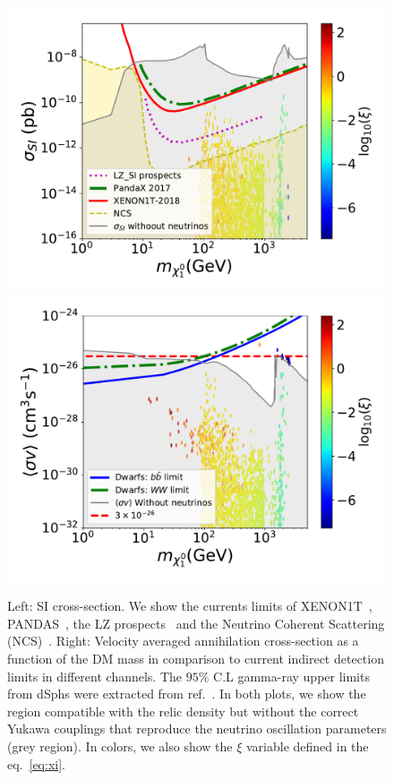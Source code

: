 \documentclass[12pt,letterpaper]{article}
\begin{document}
\begin{figure}
\begin{center}
\includegraphics[scale=0.43]{sigmaSI_with_neutrino_physics}
\includegraphics[scale=0.43]{sigmav_with_neutrino_physics}
\caption{Left: SI cross-section. We show the currents limits of XENON1T~\cite{Aprile:2018dbl}, PANDAS~\cite{Cui:2017nnn}, the LZ prospects~\cite{Mount:2017qzi} and the Neutrino Coherent Scattering (NCS)~\cite{Cushman:2013zza, Billard:2013qya}. 
Right:  Velocity averaged annihilation cross-section as a function of the DM
mass in comparison to current indirect detection limits in different channels. The $95\%$ C.L gamma-ray upper limits from dSphs were extracted from ref.~\cite{Ackermann:2015zua}.
In both plots, we show the region compatible with the relic density but without the correct Yukawa couplings that reproduce the neutrino oscillation parameters (grey region). In colors, we also show the $\xi$ variable defined in the eq.~\ref{eq:xi}.
}
\label{fig:SI-and-sv-with-neutrinos-scan}
\end{center}
\end{figure}
\end{document}
